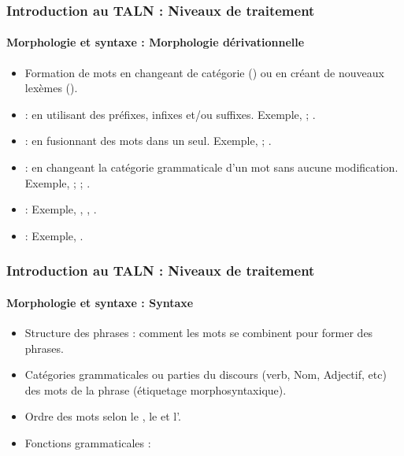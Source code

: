 \documentclass[xcolor=table]{beamer}
\begin{document}
\begin{frame}
\frametitle{Introduction au TALN : Niveaux de traitement}
\framesubtitle{Morphologie et syntaxe : Morphologie dérivationnelle}
\begin{itemize}
	\item Formation de mots en changeant de catégorie () ou en créant de nouveaux lexèmes ().
	
	\item {} : en utilisant des préfixes, infixes et/ou suffixes. 
	Exemple, ; .
	
	\item {} : en fusionnant des mots dans un seul. 
	Exemple, ; .
	
	\item {} : en changeant la catégorie grammaticale d'un mot sans aucune modification. 
	Exemple, ; ; .
	
	\item {} : 
	Exemple, , , .
	
	\item {} : Exemple, . 
	
\end{itemize}

\end{frame}

\begin{frame}
\frametitle{Introduction au TALN : Niveaux de traitement}
\framesubtitle{Morphologie et syntaxe : Syntaxe}

\begin{itemize}
	\item Structure des phrases : comment les mots se combinent pour former des phrases.
	\item Catégories grammaticales ou parties du discours (verb, Nom, Adjectif, etc) des mots de la phrase (étiquetage morphosyntaxique).
	\item Ordre des mots selon le , le  et l'.
	\item Fonctions grammaticales : 
\end{itemize}

\end{frame}
\end{document}
